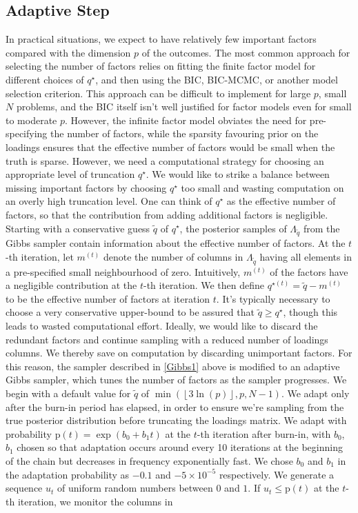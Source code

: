 \documentclass[a4paper,12pt,fleqn]{article}
\numberwithin{equation}{section}
\begin{document}
\subsection[Adaptive Step]{Adaptive Step}
\label{Adapt_Section}
In practical situations, we expect to have relatively few important factors compared with the dimension $p$ of the outcomes. The most common approach for selecting the number of factors relies on fitting the finite factor model for different choices of $q^\star$, and then using the BIC, BIC-MCMC, or another model selection criterion. This approach can be difficult to implement for large $p$, small $N$ problems, and the BIC itself isn't well justified for factor models even for small to moderate $p$. However, the infinite factor model obviates the need for pre-specifying the number of factors, while the sparsity favouring prior on the loadings ensures that the effective number of factors would be small when the truth is sparse. However, we need a computational strategy for choosing an appropriate level of truncation $q^\star$. We would like to strike a balance between missing important factors by choosing $q^\star$ too small and wasting computation on an overly high truncation level. One can think of $q^\star$ as the effective number of factors, so that the contribution from adding additional factors is negligible. Starting with a conservative guess $\tilde{q}$ of $q^\star$, the posterior samples of $\Lambda_{\tilde{q}}$ from the Gibbs sampler contain information about the effective number of factors. At the $t$-th iteration, let $m^{\left(t\right)}$ denote the number of columns in $\Lambda_{\tilde{q}}$ having all elements in a pre-specified small neighbourhood of zero. Intuitively, $m^{\left(t\right)}$ of the factors have a negligible contribution at the $t$-th iteration. We then define $q^{\star\left(t\right)} = \tilde{q} - m^{\left(t\right)}$ to be the effective number of factors at iteration $t$. It's typically necessary to choose a very conservative upper-bound to be assured that $\tilde{q} \geq q^\star$, though this leads to wasted computational effort. Ideally, we would like to discard the redundant factors and continue sampling with a reduced number of loadings columns. We thereby save on computation by discarding unimportant factors. For this reason, the sampler described in \ref{Gibbs1} above is modified to an adaptive Gibbs sampler, which tunes the number of factors as the sampler progresses. We begin with a default value for $\tilde{q}$ of $\min\left(\left\lfloor 3\ln(p)\right\rfloor, p, N-1\right)$. We adapt only after the burn-in period has elapsed, in order to ensure we're sampling from the true posterior distribution before truncating the loadings matrix. We adapt with probability $\mathrm{p}\left(t\right) = \exp\left(b_0 + b_1t\right)$ at the $t$-th iteration after burn-in, with $b_0$, $b_1$ chosen so that adaptation occurs around every 10 iterations at the beginning of the chain but decreases in frequency exponentially fast. We chose $b_0$ and $b_1$ in the adaptation probability as $-0.1$ and $-5 \times 10^{-5}$ respectively. We generate a sequence $u_t$ of uniform random numbers between $0$ and $1$. If $u_t \leq \mathrm{p}\left(t\right)$ at the $t$-th iteration, we monitor the columns in 
\end{document}
